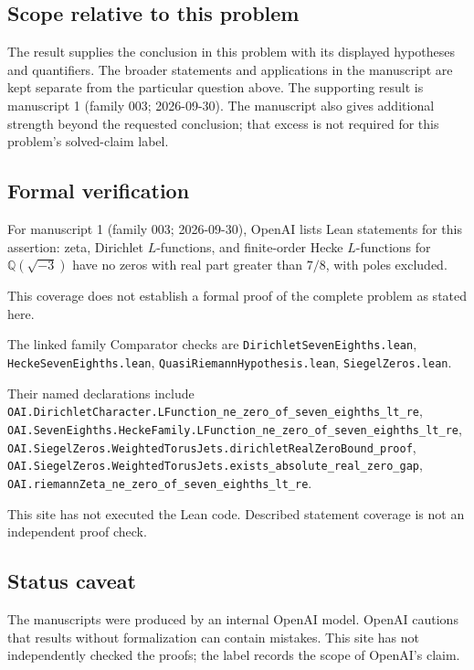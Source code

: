 \documentclass[11pt]{article}
\begin{document}
\subsection{Scope relative to this problem}
The result supplies the conclusion in this problem with its displayed hypotheses and quantifiers. The broader statements and applications in the manuscript are kept separate from the particular question above. The supporting result is manuscript 1 (family 003; 2026-09-30). The manuscript also gives additional strength beyond the requested conclusion; that excess is not required for this problem's solved-claim label.

\subsection{Formal verification}
For manuscript 1 (family 003; 2026-09-30), OpenAI lists Lean statements for this assertion: zeta, Dirichlet $L$-functions, and finite-order Hecke $L$-functions for $\mathbb Q(\sqrt{-3})$ have no zeros with real part greater than $7/8$, with poles excluded.

This coverage does not establish a formal proof of the complete problem as stated here.

The linked family Comparator checks are \texttt{DirichletSevenEighths.lean}, \texttt{HeckeSevenEighths.lean}, \texttt{QuasiRiemannHypothesis.lean}, \texttt{SiegelZeros.lean}.

Their named declarations include \texttt{OAI.DirichletCharacter.LFunction\_ne\_zero\_of\_seven\_eighths\_lt\_re}, \texttt{OAI.SevenEighths.HeckeFamily.LFunction\_ne\_zero\_of\_seven\_eighths\_lt\_re}, \texttt{OAI.SiegelZeros.WeightedTorusJets.dirichletRealZeroBound\_proof}, \texttt{OAI.SiegelZeros.WeightedTorusJets.exists\_absolute\_real\_zero\_gap}, \texttt{OAI.riemannZeta\_ne\_zero\_of\_seven\_eighths\_lt\_re}.

This site has not executed the Lean code. Described statement coverage is not an independent proof check.

\subsection{Status caveat}
The manuscripts were produced by an internal OpenAI model. OpenAI cautions that results without formalization can contain mistakes. This site has not independently checked the proofs; the label records the scope of OpenAI's claim.
\end{document}
